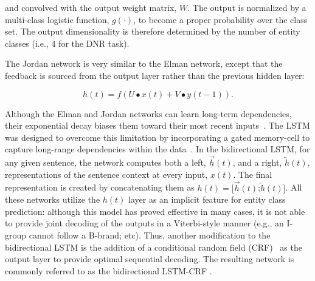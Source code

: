 \documentclass[11pt,letterpaper]{article}
\begin{document}
\noindent and convolved with the output weight matrix, $W$. The output is normalized by a multi-class logistic function, $g(\cdot)$, to become a proper probability over the class set. The output dimensionality is therefore determined by the number of entity classes (i.e., $4$ for the DNR task).

The Jordan network is very similar to the Elman network, except that the feedback is sourced from the output layer rather than the previous hidden layer:


\begin{equation}
h(t) = f( U \bullet x(t) + V \bullet y(t-1) ).
\end{equation}


Although the Elman and Jordan networks can learn long-term dependencies, their exponential decay biases them toward their most recent inputs~\cite{bengio1994learning}. The LSTM was designed to overcome this limitation by incorporating a gated memory-cell to capture long-range dependencies within the data~\cite{hochreiter1997long}. In the bidirectional LSTM, for any given sentence, the network computes both a left, $\overrightarrow{h}(t)$, and a right, $\overleftarrow{ h}(t)$, representations of the sentence context at every input, $x(t)$. The final representation is created by concatenating them as $h(t) = [\overrightarrow{h}(t)$;$\overleftarrow{ h}(t)]$. All these networks utilize the $h(t)$ layer as an implicit feature for entity class prediction: although this model has proved effective in many cases, it is not able to provide joint decoding of the outputs in a Viterbi-style manner (e.g., an I-group cannot follow a B-brand; etc). Thus, another modification to the bidirectional LSTM is the addition of a conditional random field (CRF)~\cite{lafferty2001conditional} as the output layer to provide optimal sequential decoding. The resulting network is commonly referred to as the bidirectional LSTM-CRF \cite{lample2016neural}.
\end{document}
